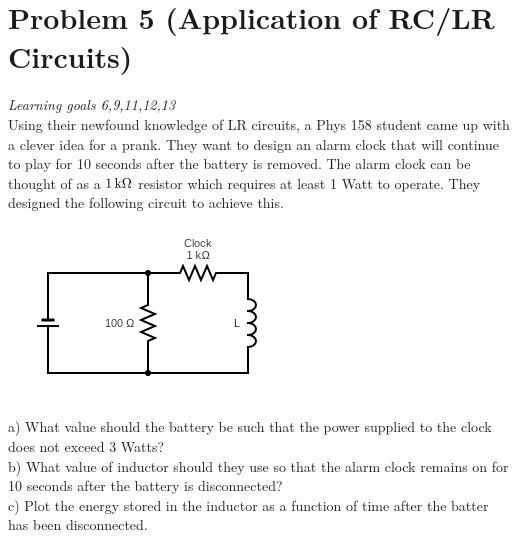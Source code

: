 \documentclass[11pt, fleqn]{article}
\begin{document}
\section*{Problem 5 (Application of RC/LR Circuits)}
\textit{Learning goals 6,9,11,12,13}\\
Using their newfound knowledge of LR circuits, a Phys 158 student came up with a clever idea for a prank. They want to design an alarm clock that will continue to play for 10 seconds after the battery is removed. The alarm clock can be thought of as a $1\,\mathrm{k\Omega}$ resistor which requires at least 1 Watt to operate. They designed the following circuit to achieve this.\\
\includegraphics{Images/AlarmClockCircuit}\\
a) What value should the battery be such that the power supplied to the clock does not exceed 3 Watts?\\
b) What value of inductor should they use so that the alarm clock remains on for 10 seconds after the battery is disconnected?\\
c) Plot the energy stored in the inductor as a function of time after the batter has been disconnected.\\
\end{document}
